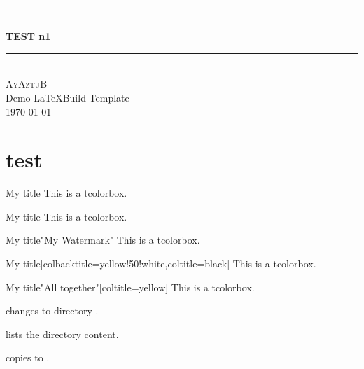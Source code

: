 \documentclass[12pt,a4paper]{article}
\theoremstyle{definition}
\begin{document}
\begin{titlepage}
	\newcommand{\HRule}{\rule{\linewidth}{0.5mm}}
	\center
	\textsc{\LARGE
	} \\[1cm]
	\HRule \\[0.4cm]
	{ \huge \bfseries TEST n1\\[0.15cm] }
	\HRule \\[1.5cm]
	\textsc{AyAztuB}\\[0.5cm]
	Demo \LaTeX Build Template\\[0.5cm]
	\today
	\\[1.5cm]

\end{titlepage}

\tableofcontents
\newpage

\section{test}

\begin{mybox}{My title}
  This is a tcolorbox.
\end{mybox}
 
\begin{mybox}[blue]{My title}
  This is a tcolorbox.
\end{mybox}
 
\begin{mybox}[green]{My title}"My Watermark"
  This is a tcolorbox.
\end{mybox}
 
\begin{mybox}[yellow]{My title}[colbacktitle=yellow!50!white,coltitle=black]
  This is a tcolorbox.
\end{mybox}
 
\begin{mybox}[purple]{My title}"All together"[coltitle=yellow]
  This is a tcolorbox.
\end{mybox}

 changes to directory .

 lists the directory content.

 copies  to .


\end{document}
